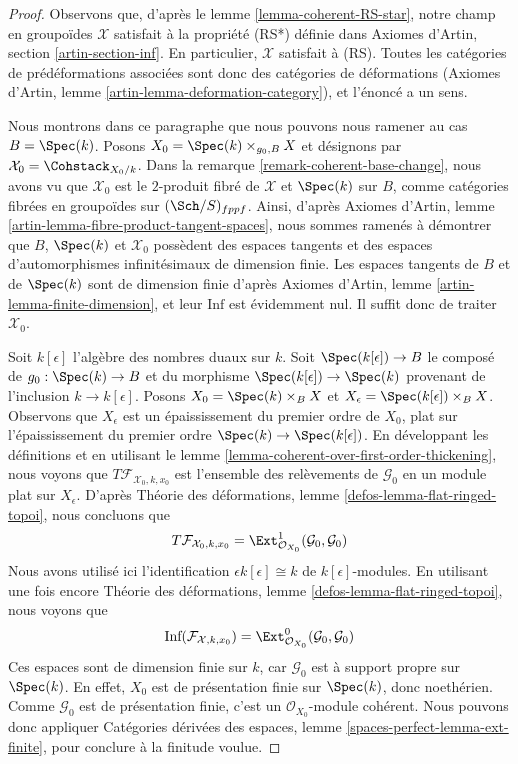 \begin{proof}
Observons que, d'après le lemme \ref{lemma-coherent-RS-star}, notre champ en
groupoïdes $\mathcal{X}$ satisfait à la propriété (RS*) définie dans Axiomes
d'Artin, section \ref{artin-section-inf}. En particulier, $\mathcal{X}$
satisfait à (RS). Toutes les catégories de prédéformations associées sont donc
des catégories de déformations (Axiomes d'Artin, lemme
\ref{artin-lemma-deformation-category}), et l'énoncé a un sens.

\medskip\noindent
Nous montrons dans ce paragraphe que nous pouvons nous ramener au cas
$B = \Spec(k)$. Posons $X_0 = \Spec(k) \times_{g_0, B} X$ et désignons par
$\mathcal{X}_0 = \Cohstack_{X_0/k}$. Dans la remarque
\ref{remark-coherent-base-change}, nous avons vu que $\mathcal{X}_0$ est le
$2$-produit fibré de $\mathcal{X}$ et $\Spec(k)$ sur $B$, comme catégories
fibrées en groupoïdes sur $(\Sch/S)_{fppf}$. Ainsi, d'après Axiomes d'Artin,
lemme \ref{artin-lemma-fibre-product-tangent-spaces}, nous sommes ramenés à
démontrer que $B$, $\Spec(k)$ et $\mathcal{X}_0$ possèdent des espaces
tangents et des espaces d'automorphismes infinitésimaux de dimension finie.
Les espaces tangents de $B$ et de $\Spec(k)$ sont de dimension finie d'après
Axiomes d'Artin, lemme \ref{artin-lemma-finite-dimension}, et leur
$\text{Inf}$ est évidemment nul. Il suffit donc de traiter $\mathcal{X}_0$.

\medskip\noindent
Soit $k[\epsilon]$ l'algèbre des nombres duaux sur $k$. Soit
$\Spec(k[\epsilon]) \to B$ le composé de $g_0 : \Spec(k) \to B$ et du
morphisme $\Spec(k[\epsilon]) \to \Spec(k)$ provenant de l'inclusion
$k \to k[\epsilon]$. Posons $X_0 = \Spec(k) \times_B X$ et
$X_\epsilon = \Spec(k[\epsilon]) \times_B X$. Observons que $X_\epsilon$ est
un épaississement du premier ordre de $X_0$, plat sur l'épaississement du
premier ordre $\Spec(k) \to \Spec(k[\epsilon])$. En développant les
définitions et en utilisant le lemme
\ref{lemma-coherent-over-first-order-thickening}, nous voyons que
$T\mathcal{F}_{\mathcal{X}_0, k, x_0}$ est l'ensemble des relèvements de
$\mathcal{G}_0$ en un module plat sur $X_\epsilon$. D'après Théorie des
déformations, lemme \ref{defos-lemma-flat-ringed-topoi}, nous concluons que
$$
T\mathcal{F}_{\mathcal{X}_0, k, x_0} =
\Ext^1_{\mathcal{O}_{X_0}}(\mathcal{G}_0, \mathcal{G}_0)
$$
Nous avons utilisé ici l'identification $\epsilon k[\epsilon] \cong k$ de
$k[\epsilon]$-modules. En utilisant une fois encore Théorie des déformations,
lemme \ref{defos-lemma-flat-ringed-topoi}, nous voyons que
$$
\text{Inf}(\mathcal{F}_{\mathcal{X}, k, x_0}) =
\Ext^0_{\mathcal{O}_{X_0}}(\mathcal{G}_0, \mathcal{G}_0)
$$
Ces espaces sont de dimension finie sur $k$, car $\mathcal{G}_0$ est à support
propre sur $\Spec(k)$. En effet, $X_0$ est de présentation finie sur
$\Spec(k)$, donc noethérien. Comme $\mathcal{G}_0$ est de présentation finie,
c'est un $\mathcal{O}_{X_0}$-module cohérent. Nous pouvons donc appliquer
Catégories dérivées des espaces, lemme
\ref{spaces-perfect-lemma-ext-finite}, pour conclure à la finitude voulue.
\end{proof}

